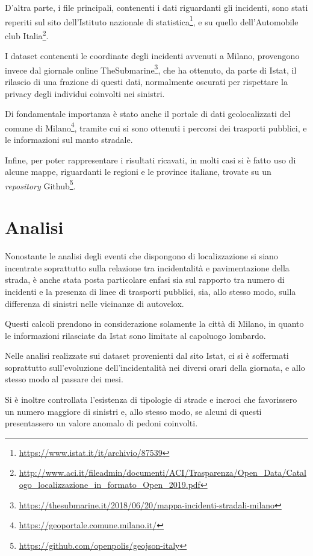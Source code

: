 \documentclass[a4paper]{article}
\newcommand{\skipline}{\vspace{0.2in}}
\begin{document}
D'altra parte, i file principali, contenenti i dati riguardanti gli incidenti, sono 
stati reperiti sul sito 
dell'Istituto nazionale di statistica\footnote{\url{https://www.istat.it/it/archivio/87539}}, 
e su quello dell'Automobile club 
Italia\footnote{\url{http://www.aci.it/fileadmin/documenti/ACI/Trasparenza/Open_Data/Catalogo_localizzazione_in_formato_Open_2019.pdf}}. 

I dataset contenenti le coordinate degli incidenti avvenuti a Milano, 
provengono invece dal giornale online 
TheSubmarine\footnote{\url{https://thesubmarine.it/2018/06/20/mappa-incidenti-stradali-milano}}, 
che ha ottenuto, da parte di Istat, il rilascio di una frazione di questi dati, 
normalmente oscurati per rispettare la privacy degli individui coinvolti nei sinistri. 

Di fondamentale importanza è stato anche il portale di dati geolocalizzati del comune di 
Milano\footnote{\url{https://geoportale.comune.milano.it/}}, 
tramite cui si sono ottenuti i percorsi dei trasporti pubblici, e le 
informazioni sul manto stradale.

Infine, per poter rappresentare i risultati ricavati, in molti casi si è fatto uso di 
alcune mappe, riguardanti le regioni e le province italiane, trovate su un \textit{repository} 
Github\footnote{\url{https://github.com/openpolis/geojson-italy}}.

\section{Analisi}

Nonostante le analisi degli eventi che dispongono di localizzazione 
si siano incentrate soprattutto sulla relazione tra incidentalità e pavimentazione 
della strada, è anche stata posta particolare enfasi sia sul rapporto tra numero di 
incidenti e la presenza di linee di trasporti pubblici, sia, 
allo stesso modo, sulla differenza di sinistri nelle vicinanze di autovelox. 

Questi calcoli prendono in considerazione solamente la città di Milano, 
in quanto le informazioni rilasciate da Istat sono limitate al capoluogo lombardo.

\skipline
Nelle analisi realizzate sui dataset provenienti dal sito Istat, 
ci si è soffermati soprattutto sull'evoluzione dell'incidentalità nei diversi orari 
della giornata, e allo stesso modo al passare dei mesi. 

Si è inoltre controllata l'esistenza di tipologie di strade e incroci che favorissero 
un numero maggiore di sinistri e, allo stesso modo, se alcuni di questi presentassero 
un valore anomalo di pedoni coinvolti. 
\end{document}
